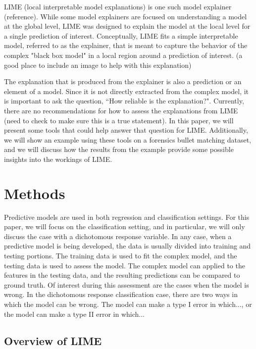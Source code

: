 \documentclass[AMS,STIX2COL]{WileyNJD-v2}
\begin{document}
LIME (local interpretable model explanations) is one such model explainer (reference). While some model explainers are focused on understanding a model at the global level, LIME was designed to explain the model at the local level for a single prediction of interest. Conceptually, LIME fits a simple interpretable model, referred to as the explainer, that is meant to capture the behavior of the complex "black box model" in a local region around a prediction of interest. (a good place to include an image to help with this explanation)

The explanation that is produced from the explainer is also a prediction or an element of a model. Since it is not directly extracted from the complex model, it is important to ask the question, ``How reliable is the explanation?". Currently, there are no recommendations for how to assess the explanations from LIME (need to check to make sure this is a true statement). In this paper, we will present some tools that could help answer that question for LIME. Additionally, we will show an example using these tools on a forensics bullet matching dataset, and we will discuss how the results from the example provide some possible insights into the workings of LIME.

\section{Methods}

Predictive models are used in both regression and classification settings. For this paper, we will focus on the classification setting, and in particular, we will only discuss the case with a dichotomous response variable. In any case, when a predictive model is being developed, the data is usually divided into training and testing portions. The training data is used to fit the complex model, and the testing data is used to assess the model. The complex model can applied to the features in the testing data, and the resulting predictions can be compared to ground truth. Of interest during this assessment are the cases when the model is wrong. In the dichotomous response classification case, there are two ways in which the model can be wrong. The model can make a type I error in which..., or the model can make a type II error in which...

\subsection{Overview of LIME}
\end{document}
